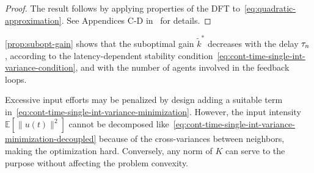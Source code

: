 {\begin{prop}
	\end{prop}
	\begin{proof}
		The result follows by applying properties of the DFT to~\eqref{eq:quadratic-approximation}.
		See Appendices C-D in~\cite{2021arXiv210110394B} for details.
	\end{proof}
	\cref{prop:subopt-gain} shows that %
	the suboptimal gain $ \tilde{k}^* $ decreases with
	the delay $ \tau_n $, according to the
	latency-dependent stability condition~\eqref{eq:cont-time-single-int-variance-condition},
	and with the number of agents involved in the feedback loops.
	
	\begin{rem}
		Excessive input efforts may be penalized by design adding a suitable term in~\eqref{eq:cont-time-single-int-variance-minimization}.
		However, the input intensity $ \mathbb{E}[\lVert u(t)\rVert^2] $
		cannot be decomposed like~\eqref{eq:cont-time-single-int-variance-minimization-decoupled}
		because of the cross-variances between neighbors,
		making the optimization hard.
		Conversely, any norm of $ K $
		can serve to the purpose without affecting the problem convexity.
	\end{rem}
	\fi
}